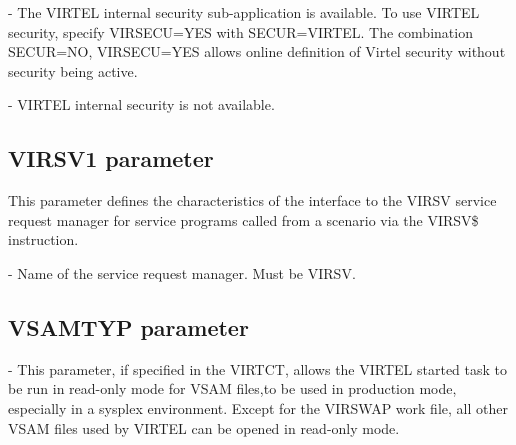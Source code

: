 \documentclass[letterpaper,10pt,english]{sphinxmanual}
\begin{document}
 - The VIRTEL internal security sub-application is available. To use VIRTEL security, specify VIRSECU=YES with SECUR=VIRTEL. The combination SECUR=NO, VIRSECU=YES allows online definition of Virtel security without security being active.

 - VIRTEL internal security is not available.

\ignorespaces 

\subsection{VIRSV1 parameter}
\label{\detokenize{Installation_Guide:virsv1-parameter}}\label{\detokenize{Installation_Guide:index-136}}
\begin{sphinxVerbatim}[commandchars=\\\{\}]
 
\end{sphinxVerbatim}

This parameter defines the characteristics of the interface to the VIRSV service request manager for service programs called from a scenario via the VIRSV\$ instruction.

 - Name of the service request manager. Must be VIRSV.

\ignorespaces 

\subsection{VSAMTYP parameter}
\label{\detokenize{Installation_Guide:vsamtyp-parameter}}\label{\detokenize{Installation_Guide:index-137}}
\begin{sphinxVerbatim}[commandchars=\\\{\}]
\PYG{p}{[}\PYG{p}{]} 
\end{sphinxVerbatim}

 - This parameter, if specified in the VIRTCT, allows the VIRTEL started task to be run in read-only mode for VSAM files,to be used in production mode, especially in a sysplex environment. Except for the VIRSWAP work file, all other VSAM files used by VIRTEL can be opened in read-only mode.
\end{document}
